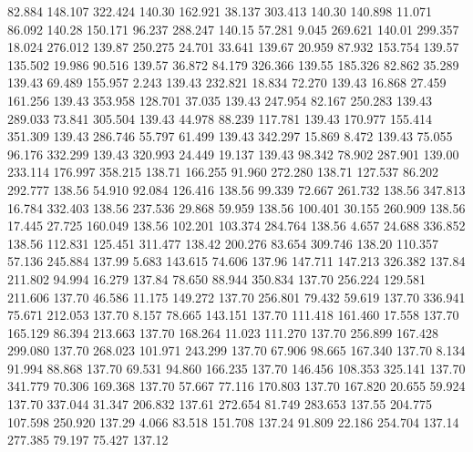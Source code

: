   82.884  148.107  322.424       140.30
 162.921   38.137  303.413       140.30
 140.898   11.071   86.092       140.28
 150.171   96.237  288.247       140.15
  57.281    9.045  269.621       140.01
 299.357   18.024  276.012       139.87
 250.275   24.701   33.641       139.67
  20.959   87.932  153.754       139.57
 135.502   19.986   90.516       139.57
  36.872   84.179  326.366       139.55
 185.326   82.862   35.289       139.43
  69.489  155.957    2.243       139.43
 232.821   18.834   72.270       139.43
  16.868   27.459  161.256       139.43
 353.958  128.701   37.035       139.43
 247.954   82.167  250.283       139.43
 289.033   73.841  305.504       139.43
  44.978   88.239  117.781       139.43
 170.977  155.414  351.309       139.43
 286.746   55.797   61.499       139.43
 342.297   15.869    8.472       139.43
  75.055   96.176  332.299       139.43
 320.993   24.449   19.137       139.43
  98.342   78.902  287.901       139.00
 233.114  176.997  358.215       138.71
 166.255   91.960  272.280       138.71
 127.537   86.202  292.777       138.56
  54.910   92.084  126.416       138.56
  99.339   72.667  261.732       138.56
 347.813   16.784  332.403       138.56
 237.536   29.868   59.959       138.56
 100.401   30.155  260.909       138.56
  17.445   27.725  160.049       138.56
 102.201  103.374  284.764       138.56
   4.657   24.688  336.852       138.56
 112.831  125.451  311.477       138.42
 200.276   83.654  309.746       138.20
 110.357   57.136  245.884       137.99
   5.683  143.615   74.606       137.96
 147.711  147.213  326.382       137.84
 211.802   94.994   16.279       137.84
  78.650   88.944  350.834       137.70
 256.224  129.581  211.606       137.70
  46.586   11.175  149.272       137.70
 256.801   79.432   59.619       137.70
 336.941   75.671  212.053       137.70
   8.157   78.665  143.151       137.70
 111.418  161.460   17.558       137.70
 165.129   86.394  213.663       137.70
 168.264   11.023  111.270       137.70
 256.899  167.428  299.080       137.70
 268.023  101.971  243.299       137.70
  67.906   98.665  167.340       137.70
   8.134   91.994   88.868       137.70
  69.531   94.860  166.235       137.70
 146.456  108.353  325.141       137.70
 341.779   70.306  169.368       137.70
  57.667   77.116  170.803       137.70
 167.820   20.655   59.924       137.70
 337.044   31.347  206.832       137.61
 272.654   81.749  283.653       137.55
 204.775  107.598  250.920       137.29
   4.066   83.518  151.708       137.24
  91.809   22.186  254.704       137.14
 277.385   79.197   75.427       137.12
